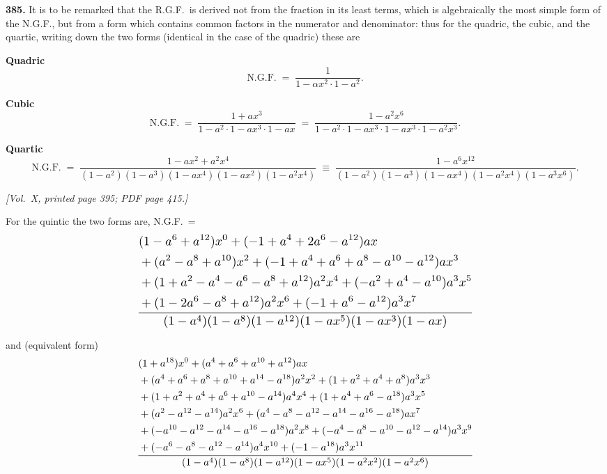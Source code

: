 \documentclass[11pt]{article}
\begin{document}
\medskip

\noindent\textbf{385.} It is to be remarked that the R.G.F.\ is derived not from the fraction in its least terms, which is algebraically the most simple form of the N.G.F., but from a form which contains common factors in the numerator and denominator: thus for the quadric, the cubic, and the quartic, writing down the two forms (identical in the case of the quadric) these are

\medskip

\noindent\textbf{Quadric}
\[
\text{N.G.F.} \;=\; \frac{1}{1-\alpha x^{2}\cdot 1-a^{2}}.
\]

\noindent\textbf{Cubic}
\[
\text{N.G.F.} \;=\; \frac{1+ax^{3}}{1-a^{2}\cdot 1-ax^{3}\cdot 1-ax}
\;=\; \frac{1-a^{2}x^{6}}{1-a^{2}\cdot 1-ax^{3}\cdot 1-ax^{3}\cdot 1-a^{2}x^{3}}.
\]

\noindent\textbf{Quartic}
\[
\text{N.G.F.} \;=\; \frac{1-ax^{2}+a^{2}x^{4}}{(1-a^{2})(1-a^{3})(1-ax^{4})(1-ax^{2})(1-a^{2}x^{4})}
\;\equiv\; \frac{1-a^{6}x^{12}}{(1-a^{2})(1-a^{3})(1-ax^{4})(1-a^{2}x^{4})(1-a^{3}x^{6})}.
\]

\newpage

\noindent\textit{[Vol.~X, printed page 395; PDF page 415.]}

\medskip

For the quintic the two forms are, N.G.F.\ =
\[
\resizebox{\textwidth}{!}{$\displaystyle
\frac{
\begin{aligned}
&(1-a^{6}+a^{12})x^{0}
 +(-1+a^{4}+2a^{6}-a^{12})ax \\
&+(a^{2}-a^{8}+a^{10})x^{2}
 +(-1+a^{4}+a^{6}+a^{8}-a^{10}-a^{12})ax^{3} \\
&+(1+a^{2}-a^{4}-a^{6}-a^{8}+a^{12})a^{2}x^{4}
 +(-a^{2}+a^{4}-a^{10})a^{3}x^{5} \\
&+(1-2a^{6}-a^{8}+a^{12})a^{2}x^{6}
 +(-1+a^{6}-a^{12})a^{3}x^{7}
\end{aligned}
}{
(1-a^{4})(1-a^{8})(1-a^{12})(1-ax^{5})(1-ax^{3})(1-ax)
}
$}
\]

\noindent and (equivalent form)
\[
\resizebox{\textwidth}{!}{$\displaystyle
\frac{
\begin{aligned}
&(1+a^{18})x^{0}
 +(a^{4}+a^{6}+a^{10}+a^{12})ax \\
&+(a^{4}+a^{6}+a^{8}+a^{10}+a^{14}-a^{18})a^{2}x^{2}
 +(1+a^{2}+a^{4}+a^{8})a^{3}x^{3} \\
&+(1+a^{2}+a^{4}+a^{6}+a^{10}-a^{14})a^{4}x^{4}
 +(1+a^{4}+a^{6}-a^{18})a^{3}x^{5} \\
&+(a^{2}-a^{12}-a^{14})a^{2}x^{6}
 +(a^{4}-a^{8}-a^{12}-a^{14}-a^{16}-a^{18})ax^{7} \\
&+(-a^{10}-a^{12}-a^{14}-a^{16}-a^{18})a^{2}x^{8}
 +(-a^{4}-a^{8}-a^{10}-a^{12}-a^{14})a^{3}x^{9} \\
&+(-a^{6}-a^{8}-a^{12}-a^{14})a^{4}x^{10}
 +(-1-a^{18})a^{3}x^{11}
\end{aligned}
}{
(1-a^{4})(1-a^{8})(1-a^{12})(1-ax^{5})(1-a^{2}x^{2})(1-a^{2}x^{6})
}
$}
\]
\end{document}
